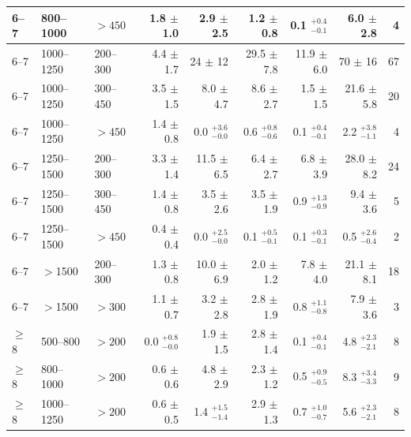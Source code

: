 \begin{table}[!hp]
{\begin{tabular}{lll|r|r|r|r|r|r}
      6--7     & 800--1000   & $>450$   &    1.8 $\pm$    1.0       &    2.9 $\pm$    2.5      &   1.2 $\pm$    0.8      &  0.1 $^{+0.4}_{-0.1}$       & 6.0    $\pm$    2.8    &     4  \\ \hline
      6--7     & 1000--1250  & 200--300  &    4.4 $\pm$    1.7       &   24   $\pm$   12        &  29.5 $\pm$    7.8      & 11.9 $\pm$    6.0       &  70    $\pm$   16      &    67  \\
      6--7     & 1000--1250  & 300--450  &    3.5 $\pm$    1.5       &    8.0 $\pm$    4.7      &   8.6 $\pm$    2.7      &  1.5 $\pm$    1.5       & 21.6   $\pm$    5.8    &    20  \\
      6--7     & 1000--1250  & $>450$   &    1.4 $\pm$    0.8       &    0.0 $^{+3.6}_{-0.0}$      &   0.6 $^{+0.8}_{-0.6}$      &  0.1 $^{+0.4}_{-0.1}$       & 2.2    $^{+3.8}_{-1.1}$    &     4  \\ \hline
      6--7     & 1250--1500  & 200--300  &    3.3 $\pm$    1.4       &   11.5 $\pm$    6.5      &   6.4 $\pm$    2.7      &  6.8 $\pm$    3.9       & 28.0   $\pm$    8.2    &    24  \\
      6--7     & 1250--1500  & 300--450  &    1.4 $\pm$    0.8       &    3.5 $\pm$    2.6      &   3.5 $\pm$    1.9      &  0.9 $^{+1.3}_{-0.9}$       & 9.4    $\pm$    3.6    &     5  \\
      6--7     & 1250--1500  & $>450$   &    0.4 $\pm$    0.4       &    0.0 $^{+2.5}_{-0.0}$      &   0.1 $^{+0.5}_{-0.1}$      &  0.1 $^{+0.3}_{-0.1}$       & 0.5    $^{+2.6}_{-0.4}$    &     2  \\ \hline
      6--7     & $>$1500    & 200--300  &    1.3 $\pm$    0.8       &   10.0 $\pm$    6.9      &   2.0 $\pm$    1.2      &  7.8 $\pm$    4.0       & 21.1   $\pm$    8.1    &    18  \\
      6--7     & $>$1500    & $>300$   &    1.1 $\pm$    0.7       &    3.2 $\pm$    2.8      &   2.8 $\pm$    1.9      &  0.8 $^{+1.1}_{-0.8}$       & 7.9    $\pm$    3.6    &     3  \\ \hline \hline 
      $\geq$8 & 500--800    & $>200$   &    0.0 $^{+0.8}_{-0.0}$       &    1.9 $\pm$    1.5      &   2.8 $\pm$    1.4      &  0.1 $^{+0.4}_{-0.1}$       & 4.8    $^{+2.3}_{-2.1}$    &     8  \\
      $\geq$8 & 800--1000   & $>200$   &    0.6 $\pm$    0.6       &    4.8 $\pm$    2.9      &   2.3 $\pm$    1.2      &  0.5 $^{+0.9}_{-0.5}$       & 8.3    $^{+3.4}_{-3.3}$    &     9  \\
      $\geq$8 & 1000--1250  & $>200$   &    0.6 $\pm$    0.5       &    1.4 $^{+1.5}_{-1.4}$      &   2.9 $\pm$    1.3      &  0.7 $^{+1.0}_{-0.7}$       & 5.6    $^{+2.3}_{-2.1}$    &     8  \\

\end{tabular}}
\end{table}
